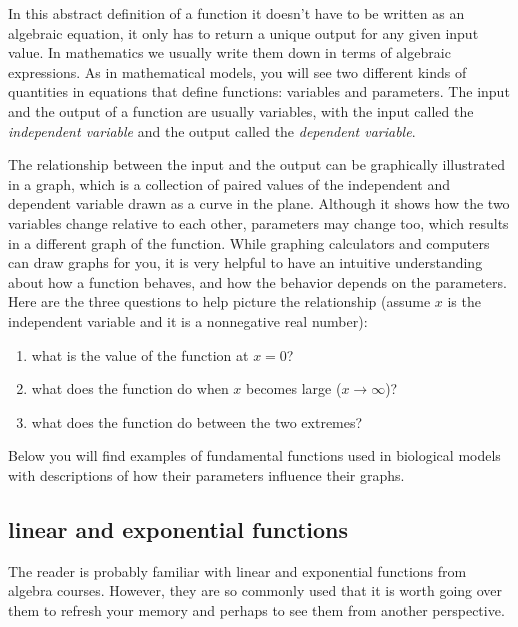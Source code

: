 \documentclass[
]{book}
\providecommand{\tightlist}{%
  \setlength{\itemsep}{0pt}\setlength{\parskip}{0pt}}
\begin{document}
In this abstract definition of a function it doesn't have to be written as an algebraic equation, it only has to return a unique output for any given input value. In mathematics we usually write them down in terms of algebraic expressions. As in mathematical models, you will see two different kinds of quantities in equations that define functions: variables and parameters. The input and the output of a function are usually variables, with the input called the  \emph{independent variable} and the output called the  \emph{dependent variable}.

The relationship between the input and the output can be graphically illustrated in a  graph, which is a collection of paired values of the independent and dependent variable drawn as a curve in the plane. Although it shows how the two variables change relative to each other, parameters may change too, which results in a different graph of the function. While graphing calculators and computers can draw graphs for you, it is very helpful to have an intuitive understanding about how a function behaves, and how the behavior depends on the parameters. Here are the three questions to help picture the relationship (assume \(x\) is the independent variable and it is a nonnegative real number):

\begin{enumerate}
\def\labelenumi{\arabic{enumi}.}
\tightlist
\item
  what is the value of the function at \(x=0\)?
\item
  what does the function do when \(x\) becomes large (\(x \to \infty\))?
\item
  what does the function do between the two extremes?
\end{enumerate}

Below you will find examples of fundamental functions used in biological models with descriptions of how their parameters influence their graphs.

\hypertarget{linear-and-exponential-functions}{%
\subsection{linear and exponential functions}\label{linear-and-exponential-functions}}

The reader is probably familiar with linear and exponential functions from algebra courses. However, they are so commonly used that it is worth going over them to refresh your memory and perhaps to see them from another perspective.
\end{document}

